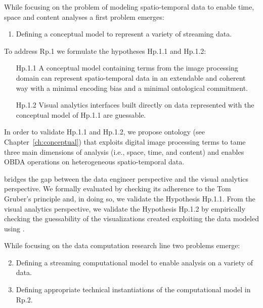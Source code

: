 While focusing on the problem of modeling spatio-temporal data to enable time, space and content analyses a first problem emerges:

\begin{enumerate}[leftmargin=32pt,label=\textsf{Rp.\arabic*}]
\item Defining a conceptual model to represent a variety of streaming data.
\end{enumerate}

To address \textsf{Rp.1} we formulate the hypotheses \textsf{Hp.1.1} and \textsf{Hp.1.2}:
\begin{itemize}[leftmargin=42pt]
\item[\textsf{Hp.1.1}] A conceptual model containing terms from the image processing domain can represent spatio-temporal data in an extendable and coherent way with a minimal encoding bias and a minimal ontological commitment.
\item[\textsf{Hp.1.2}] Visual analytics interfaces built directly on data represented with the conceptual model of Hp.1.1 are guessable.
\end{itemize}

In order to validate \textsf{Hp.1.1} and \textsf{Hp.1.2}, we propose \frappe{} ontology (see Chapter~\ref{ch:conceptual}) that exploits digital image processing terms to tame three main dimensions of analysis (i.e., space, time, and content) and enables OBDA operations on heterogeneous spatio-temporal data.

\frappe{} bridges the gap between the data engineer perspective and the visual analytics perspective.
We formally evaluated \frappe{} by checking its adherence to the Tom Gruber's principle and, in doing so, we validate the Hypothesis \textsf{Hp.1.1}.
From the visual analytics perspective, we validate the Hypothesis \textsf{Hp.1.2} by empirically checking the guessability of the visualizations created exploiting the data modeled using \frappe{}.

While focusing on the data computation research line two problems emerge:
\begin{enumerate}[leftmargin=32pt,label=\textsf{Rp.\arabic*}]
\setcounter{enumi}{1}
\item Defining a streaming computational model to enable analysis on a variety of data.
\item Defining appropriate technical instantiations of the computational model in \textsf{Rp.2}.
\end{enumerate}

